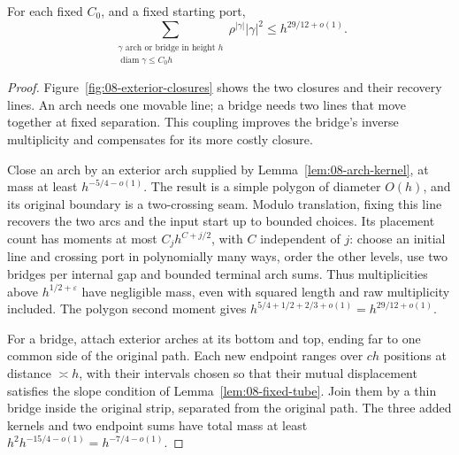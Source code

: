 \begin{proposition}
\label{prop:08-strip-second}
For each fixed \(C_0\), and a fixed starting port,
\begin{equation}
 \sum_{\substack{\gamma\text{ arch or bridge in height }h\\
                  \operatorname{diam}\gamma\le C_0h}}
       \rho^{|\gamma|}|\gamma|^2
       \le h^{29/12+o(1)}.
 \label{eq:R-32a}
\end{equation}
\end{proposition}
\begin{proof}
Figure~\ref{fig:08-exterior-closures} shows the two closures and their
recovery lines. An arch needs one movable line; a bridge needs two lines
that move together at fixed separation. This coupling improves the
bridge's inverse multiplicity and compensates for its more costly closure.


Close an arch by an exterior arch supplied by
Lemma~\ref{lem:08-arch-kernel}, at mass at least
\(h^{-5/4-o(1)}\). The result is a simple polygon of diameter \(O(h)\),
and its original boundary is a two-crossing seam. Modulo translation,
fixing this line recovers the two arcs and the input start up to bounded
choices. Its placement count has moments at most \(C_jh^{C+j/2}\),
with \(C\) independent of \(j\): choose an initial line and crossing
port in polynomially many ways, order the other levels, use two bridges
per internal gap and bounded terminal arch sums. Thus multiplicities
above \(h^{1/2+\varepsilon}\) have negligible mass, even with squared
length and raw multiplicity included. The polygon second moment gives
\(h^{5/4+1/2+2/3+o(1)}=h^{29/12+o(1)}\).

For a bridge, attach exterior arches at its bottom and top, ending far
to one common side of the original path. Each new endpoint ranges over
\(ch\) positions at distance \(\asymp h\), with their intervals chosen
so that their mutual displacement satisfies the slope condition of
Lemma~\ref{lem:08-fixed-tube}. Join them by a thin bridge inside the
original strip, separated from the original path. The three added kernels
and two endpoint sums have total mass at least
\(h^2h^{-15/4-o(1)}=h^{-7/4-o(1)}\).


\end{proof}
